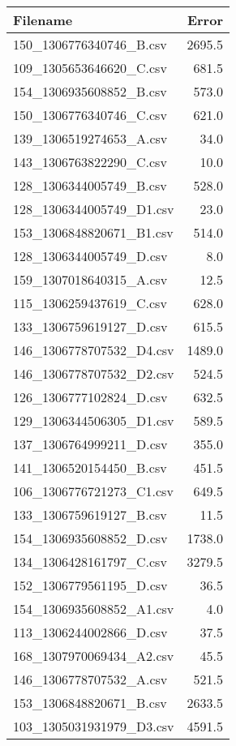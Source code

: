 \documentclass[conference]{IEEEtran}
\begin{document}
\begin{itemize}
\begin{itemize}
\begin{table}
\label{table:Error results}
\begin{tabular}{l | r }
	Filename & Error \\
	\hline
	150\_{}1306776340746\_{}B.csv & 2695.5 \\
	109\_{}1305653646620\_{}C.csv & 681.5 \\
	154\_{}1306935608852\_{}B.csv & 573.0 \\
	150\_{}1306776340746\_{}C.csv & 621.0 \\
	139\_{}1306519274653\_{}A.csv & 34.0 \\
	143\_{}1306763822290\_{}C.csv & 10.0 \\
	128\_{}1306344005749\_{}B.csv & 528.0 \\
	128\_{}1306344005749\_{}D1.csv & 23.0 \\
	153\_{}1306848820671\_{}B1.csv & 514.0 \\
	128\_{}1306344005749\_{}D.csv & 8.0 \\
	159\_{}1307018640315\_{}A.csv & 12.5 \\
	115\_{}1306259437619\_{}C.csv & 628.0 \\
	133\_{}1306759619127\_{}D.csv & 615.5 \\
	146\_{}1306778707532\_{}D4.csv & 1489.0 \\
	146\_{}1306778707532\_{}D2.csv & 524.5 \\
	126\_{}1306777102824\_{}D.csv & 632.5 \\
	129\_{}1306344506305\_{}D1.csv & 589.5 \\
	137\_{}1306764999211\_{}D.csv & 355.0 \\
	141\_{}1306520154450\_{}B.csv & 451.5 \\
	106\_{}1306776721273\_{}C1.csv & 649.5 \\
	133\_{}1306759619127\_{}B.csv & 11.5 \\
	154\_{}1306935608852\_{}D.csv & 1738.0 \\
	134\_{}1306428161797\_{}C.csv & 3279.5 \\
	152\_{}1306779561195\_{}D.csv & 36.5 \\
	154\_{}1306935608852\_{}A1.csv & 4.0 \\
	113\_{}1306244002866\_{}D.csv & 37.5 \\
	168\_{}1307970069434\_{}A2.csv & 45.5 \\
	146\_{}1306778707532\_{}A.csv & 521.5 \\
	153\_{}1306848820671\_{}B.csv & 2633.5 \\
	103\_{}1305031931979\_{}D3.csv & 4591.5 \\

\end{tabular}
\end{table}
\end{itemize}
\end{itemize}
\end{document}
